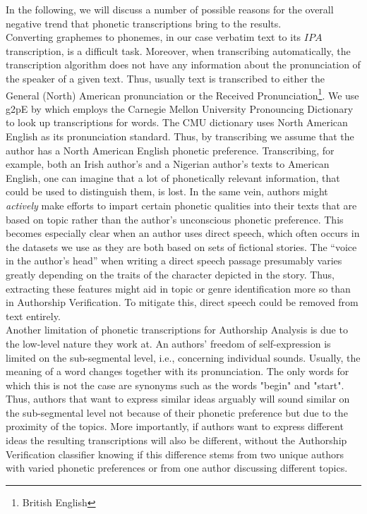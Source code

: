 In the following, we will discuss a number of possible reasons for the overall negative trend that phonetic transcriptions bring to the results.\\
Converting graphemes to phonemes, in our case verbatim text to its $IPA$ transcription, is a difficult task.
Moreover, when transcribing automatically, the transcription algorithm does not have any information about the pronunciation of the speaker of a given text.
Thus, usually text is transcribed to either the General (North) American pronunciation or the Received Pronunciation\footnote{British English}.
We use g2pE by \cite{kyubyong2019g2pE} which employs the Carnegie Mellon University Pronouncing Dictionary to look up transcriptions for words.
The CMU dictionary uses North American English as its pronunciation standard.
Thus, by transcribing we assume that the author has a North American English phonetic preference.
Transcribing, for example, both an Irish author's and a Nigerian author's texts to American English, one can imagine that a lot of phonetically relevant information, that could be used to distinguish them, is lost.
In the same vein, authors might \textit{actively} make efforts to impart certain phonetic qualities into their texts that are based on topic rather than the author's unconscious phonetic preference.
This becomes especially clear when an author uses direct speech, which often occurs in the datasets we use as they are both based on sets of fictional stories.
The ``voice in the author's head'' when writing a direct speech passage presumably varies greatly depending on the traits of the character depicted in the story.
Thus, extracting these features might aid in topic or genre identification more so than in Authorship Verification.
To mitigate this, direct speech could be removed from text entirely.\\
Another limitation of phonetic transcriptions for Authorship Analysis is due to the low-level nature they work at.
An authors' freedom of self-expression is limited on the sub-segmental level, i.e., concerning individual sounds.
Usually, the meaning of a word changes together with its pronunciation.
The only words for which this is not the case are synonyms such as the words "begin" and "start".
Thus, authors that want to express similar ideas arguably will sound similar on the sub-segmental level not because of their phonetic preference but due to the proximity of the topics.
More importantly, if authors want to express different ideas the resulting transcriptions will also be different, without the Authorship Verification classifier knowing if this difference stems from two unique authors with varied phonetic preferences or from one author discussing different topics.
